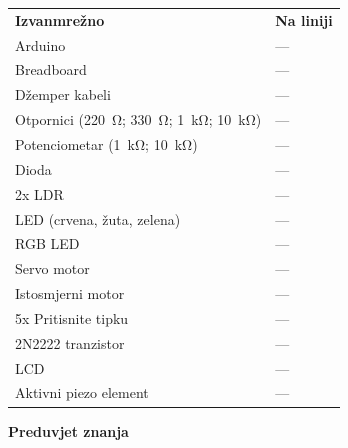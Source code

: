 \documentclass{arduino}
\begin{document}
\begin{tabular}{
    @{}>{\raggedright\arraybackslash}p{}
    >{\raggedright\arraybackslash}p{}@{}
}
\textbf{Izvanmrežno}                                                                  & \textbf{Na liniji} \\
Arduino                                                                           & ---             \\
Breadboard                                                                        & ---             \\
Džemper kabeli                                                                     & ---             \\
Otpornici (\SI{220}{\ohm}; \SI{330}{\ohm}; \SI{1}{\kilo\ohm}; \SI{10}{\kilo\ohm}) & ---             \\
Potenciometar (\SI{1}{\kilo\ohm}; \SI{10}{\kilo\ohm})                             & ---             \\
Dioda                                                                             & ---             \\
2x LDR                                                                            & ---             \\
LED (crvena, žuta, zelena)                                                          & ---             \\
RGB LED                                                                           & ---             \\
Servo motor                                                                       & ---             \\
Istosmjerni motor                                                                          & ---             \\
5x Pritisnite tipku                                                                    & ---             \\
2N2222 tranzistor                                                                 & ---             \\
LCD                                                                               & ---             \\
Aktivni piezo element                                                              & ---             \\
\end{tabular}

\textbf{Preduvjet znanja}
\end{document}
